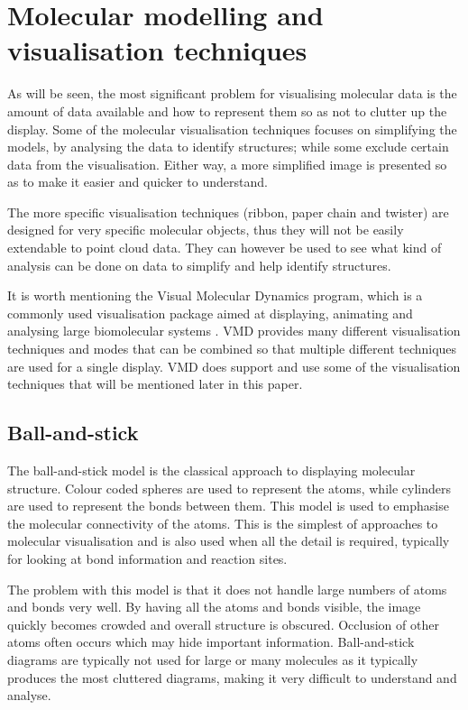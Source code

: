\documentclass[twocolumn,a4paper]{article}
\begin{document}
\section{Molecular modelling and visualisation techniques}

As will be seen, the most significant problem for visualising molecular data is
the amount of data available and how to represent them so as not to clutter up
the display. Some of the molecular visualisation techniques focuses on
simplifying the models, by analysing the data to identify structures; while some
exclude certain data from the visualisation. Either way, a more simplified image
is presented so as to make it easier and quicker to understand.

The more specific visualisation techniques (ribbon, paper chain and twister) are
designed for very specific molecular objects, thus they will not be easily
extendable to point cloud data. They can however be used to see what kind of
analysis can be done on data to simplify and help identify structures.

It is worth mentioning the Visual Molecular Dynamics \citep{humphrey96} program,
which is a commonly used visualisation package aimed at displaying, animating
and analysing large biomolecular systems \citep{VMD}. VMD provides many
different visualisation techniques and modes that can be combined so that
multiple different techniques are used for a single display. VMD does support
and use some of the visualisation techniques that will be mentioned later in
this paper.

\subsection*{Ball-and-stick}
The ball-and-stick model is the classical approach to displaying molecular
structure. Colour coded spheres are used to represent the atoms, while cylinders
are used to represent the bonds between them. This model is used to emphasise
the molecular connectivity of the atoms. This is the simplest of approaches to
molecular visualisation and is also used when all the detail is required,
typically for looking at bond information and reaction sites.

The problem with this model is that it does not handle large numbers of atoms
and bonds very well. By having all the atoms and bonds visible, the image
quickly becomes crowded and overall structure is obscured. Occlusion of other
atoms often occurs which may hide important information. Ball-and-stick diagrams
are typically not used for large or many molecules as it typically produces the
most cluttered diagrams, making it very difficult to understand and analyse.
\end{document}
